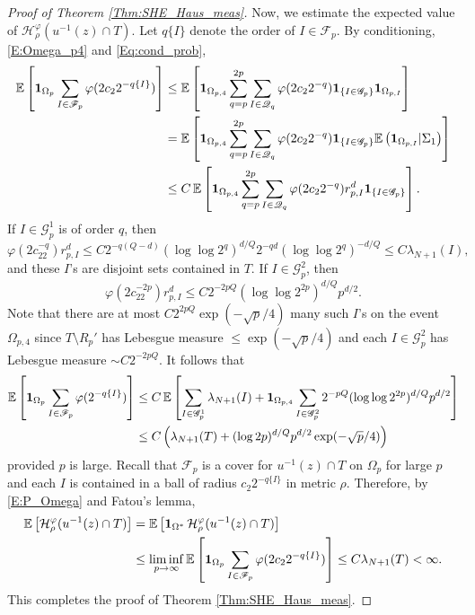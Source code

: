 \documentclass[11pt, reqno]{amsart}
\def\E{{\mathbb E}}
\numberwithin{equation}{section}
\begin{document}
\begin{proof}[Proof of Theorem \ref{Thm:SHE_Haus_meas}]
Now, we estimate the expected value of $\mathcal{H}_\rho^\varphi(u^{-1}(z)\cap T)$.
Let $q\{I\}$ denote the order of $I \in \mathscr{F}_p$. 
By conditioning, \eqref{E:Omega_p4} and \eqref{Eq:cond_prob},
\begin{align*}
\E\left[ {\bf 1}_{\Omega_p} \sum_{I \in \mathscr{F}_p} \varphi(2c_2 2^{-q\{I\}}) \right]
&\le\E\left[ {\bf 1}_{{\Omega}_{p, 4}} \sum_{q=p}^{2p}\sum_{I \in \mathscr{Q}_q} \varphi(2c_22^{-q}) 
{\bf 1}_{\{ I \in \mathscr{G}_p \}} {\bf 1}_{\Omega_{p,I}} \right]\\
& =\E\left[ {\bf 1}_{{\Omega}_{p, 4}} \sum_{q=p}^{2p}\sum_{I \in \mathscr{Q}_q} \varphi(2c_22^{-q}) 
{\bf 1}_{\{ I \in \mathscr{G}_p \}} \E\left({\bf 1}_{\Omega_{p,I}}|\Sigma_1\right)\right]\\
& \le C\, \E \left[ {\bf 1}_{{\Omega}_{p, 4}}\sum_{q=p}^{2p} \sum_{I \in \mathscr{Q}_q}
  \varphi(2c_22^{-q}) r_{p,I}^d {\bf 1}_{\{I \in \mathscr{G}_p\}} \right].
\end{align*}
If $I \in \mathscr{G}_p^1$ is of order $q$, then 
\[ \varphi(2c_22^{-q}) r_{p,I}^d \le C 2^{-q(Q-d)}(\log\log2^q)^{d/Q} 2^{-qd}(\log\log2^q)^{-d/Q} \le C \lambda_{N+1}(I), \]
and these $I$'s are disjoint sets contained in $T$.
If $I \in \mathscr{G}_p^2$, then 
\[ \varphi(2c_22^{-2p}) r_{p, I}^d \le C 2^{-2pQ} (\log\log2^{2p})^{d/Q} p^{d/2}. \]
Note that there are at most $C 2^{2pQ}\exp(-\sqrt{p}/4)$ many such $I$'s on the event $\Omega_{p, 4}$ since 
$T \setminus R_p'$ has Lebesgue measure $\le \exp(-\sqrt{p}/4)$ and each $I \in \mathscr{G}_p^2$ has 
Lebesgue measure $\sim C2^{-2pQ}$.
It follows that
\begin{align*}
\E\left[ {\bf 1}_{\Omega_p} \sum_{I \in \mathscr{F}_p} \varphi(2^{-q\{I\}}) \right]
& \le C\, \E\left[ \sum_{I \in \mathscr{G}_p^1} \lambda_{N+1}(I) + {\bf 1}_{\Omega_{p, 4}} \sum_{I \in \mathscr{G}_p^2} 
2^{-pQ}(\log\log2^{2p})^{d/Q} p^{d/2}  \right]\\
& \le C\left(\lambda_{N+1}(T) + (\log 2p)^{d/Q} p^{d/2}\exp(-\sqrt{p}/4)\right)
\end{align*}
provided $p$ is large. 
Recall that $\mathscr{F}_p$ is a cover for $u^{-1}(z) \cap T$ on $\Omega_p$ for large $p$ and 
each $I$ is contained in a ball of radius $c_2 2^{-q\{I\}}$ in metric $\rho$.
Therefore, by \eqref{E:P_Omega} and Fatou's lemma, 
\begin{align*}
\E\left[ \mathcal{H}^\varphi_\rho(u^{-1}(z) \cap T) \right]
&= \E\left[ {\bf 1}_{\Omega^*}\, \mathcal{H}^\varphi_\rho(u^{-1}(z) \cap T) \right]\\
& \le \liminf_{p \to \infty} \E\left[  {\bf 1}_{\Omega_p} \sum_{I \in \mathscr{F}_p} \varphi(2c_22^{-q\{I\}}) \right]
\le C\lambda_{N+1}(T) < \infty.
\end{align*}
This completes the proof of Theorem \ref{Thm:SHE_Haus_meas}.
\end{proof}
\end{document}
